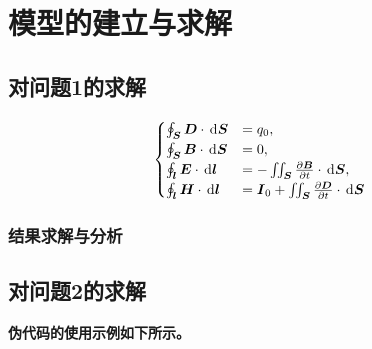 
\section{模型的建立与求解}


\subsection{对问题1的求解}

\zhlipsum[1]

\begin{equation}\label{equ:麦克斯韦方程组}
\begin{cases}
\oint_{\boldsymbol{S}}\boldsymbol{D}\cdot\operatorname{\,\mathrm{d}\hspace{-1.5pt}}\boldsymbol{S} &= q_0, \\
\oint_{\boldsymbol{S}}\boldsymbol{B}\cdot\operatorname{\,\mathrm{d}\hspace{-1.5pt}}\boldsymbol{S} &= 0, \\
\oint_{\boldsymbol{l}}\boldsymbol{E}\cdot\operatorname{\,\mathrm{d}\hspace{-1.5pt}}\boldsymbol{l} &= -\iint_{\boldsymbol{S}}\frac{\partial \boldsymbol{B}}{\partial t}\cdot\operatorname{\,\mathrm{d}\hspace{-1.5pt}}\boldsymbol{S}, \\
\oint_{\boldsymbol{l}}\boldsymbol{H}\cdot\operatorname{\,\mathrm{d}\hspace{-1.5pt}}\boldsymbol{l} &= \boldsymbol{I}_0 + \iint_{\boldsymbol{S}}\frac{\partial \boldsymbol{D}}{\partial t}\cdot\operatorname{\,\mathrm{d}\hspace{-1.5pt}}\boldsymbol{S}
\end{cases}
\end{equation}

\zhlipsum[2]

\subsubsection{结果求解与分析}


\subsection{对问题2的求解}

{\bf 伪代码的使用示例如下所示。}

